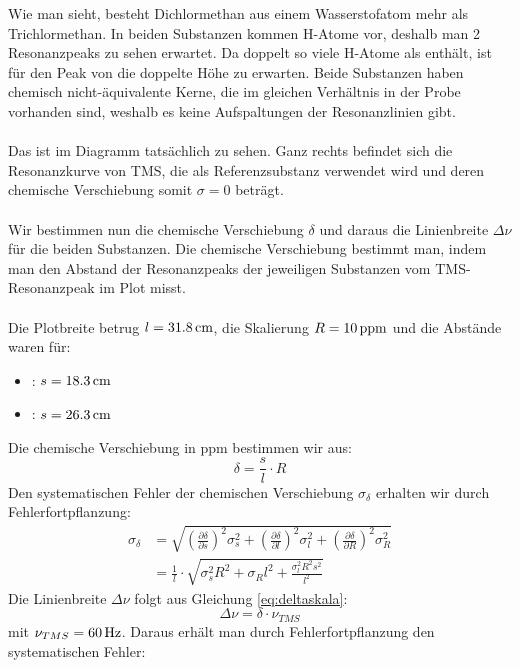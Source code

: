 \documentclass[a4paper,titlepage]{scrartcl}
\numberwithin{equation}{section}
\begin{document}
Wie man sieht, besteht Dichlormethan aus einem Wasserstofatom mehr als Trichlormethan. In beiden Substanzen kommen H-Atome vor, deshalb man 2 Resonanzpeaks zu sehen erwartet. Da  doppelt so viele H-Atome als  enthält, ist für den Peak von  die doppelte Höhe zu erwarten. Beide Substanzen haben chemisch nicht-äquivalente Kerne, die im gleichen Verhältnis in der Probe vorhanden sind, weshalb es keine Aufspaltungen der Resonanzlinien gibt.\\\\
Das ist im Diagramm tatsächlich zu sehen. Ganz rechts befindet sich die Resonanzkurve von TMS, die als Referenzsubstanz verwendet wird und deren chemische Verschiebung somit $\sigma=$0 beträgt.\\ \\
Wir bestimmen nun die chemische Verschiebung $\delta$ und daraus die Linienbreite $\Delta \nu$ für die beiden Substanzen. Die chemische Verschiebung bestimmt man, indem man den Abstand der Resonanzpeaks der jeweiligen Substanzen vom TMS-Resonanzpeak im Plot misst.\\ \\
Die Plotbreite betrug $l=\unit[31.8]{cm}$, die Skalierung $R=\unit[10]{ppm}$ und die Abstände waren für:
\begin{itemize}
\item {}: $s=\unit[18.3]{cm}$
\item {}: $s=\unit[26.3]{cm}$
\end{itemize}
Die chemische Verschiebung in ppm bestimmen wir aus:
\begin{equation*}
\delta=\frac{s}{l} \cdot R
\end{equation*}
Den systematischen Fehler der chemischen Verschiebung $\sigma_{\delta}$ erhalten wir durch Fehlerfortpflanzung:
\begin{align}
\sigma_{\delta}&=\sqrt{\left( \frac{\partial \delta}{\partial s} \right)^2 \sigma^2_s + \left( \frac{\partial \delta}{\partial l} \right)^2 \sigma^2_l + \left( \frac{\partial \delta}{\partial R} \right)^2 \sigma^2_R} \nonumber\\
&=\frac{1}{l} \cdot \sqrt{\sigma^2_s R^2+\sigma_R l^2 + \frac{\sigma^2_l R^2 s^2}{l^2}}
\label{eq:errverschiebung}
\end{align}
Die Linienbreite $\Delta \nu$ folgt aus Gleichung \ref{eq:deltaskala}:
\begin{equation*}
\Delta \nu=\delta \cdot \nu_{TMS}
\end{equation*}
mit $\nu_{TMS}=\unit[60]{Hz}$. Daraus erhält man durch Fehlerfortpflanzung den systematischen Fehler:
\end{document}
